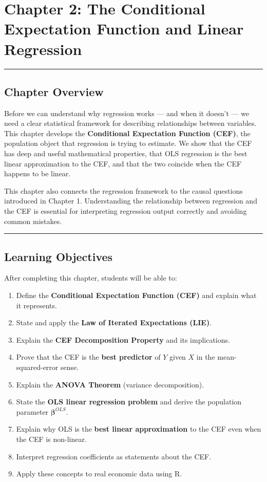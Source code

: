 \chapter{Chapter 2: The Conditional Expectation Function and Linear Regression}

\medskip\hrule\medskip

\section{Chapter Overview}

Before we can understand why regression works --- and when it doesn't --- we need a clear statistical framework for describing relationships between variables. This chapter develops the \textbf{Conditional Expectation Function (CEF)}, the population object that regression is trying to estimate. We show that the CEF has deep and useful mathematical properties, that OLS regression is the best linear approximation to the CEF, and that the two coincide when the CEF happens to be linear.

This chapter also connects the regression framework to the causal questions introduced in Chapter 1. Understanding the relationship between regression and the CEF is essential for interpreting regression output correctly and avoiding common mistakes.

\medskip\hrule\medskip

\section{Learning Objectives}

After completing this chapter, students will be able to:

\begin{enumerate}
\item Define the \textbf{Conditional Expectation Function (CEF)} and explain what it represents.
\item State and apply the \textbf{Law of Iterated Expectations (LIE)}.
\item Explain the \textbf{CEF Decomposition Property} and its implications.
\item Prove that the CEF is the \textbf{best predictor} of $Y$ given $X$ in the mean-squared-error sense.
\item Explain the \textbf{ANOVA Theorem} (variance decomposition).
\item State the \textbf{OLS linear regression problem} and derive the population parameter $\boldsymbol{\beta}^{OLS}$.
\item Explain why OLS is the \textbf{best linear approximation} to the CEF even when the CEF is non-linear.
\item Interpret regression coefficients as statements about the CEF.
\item Apply these concepts to real economic data using R.
\end{enumerate}

